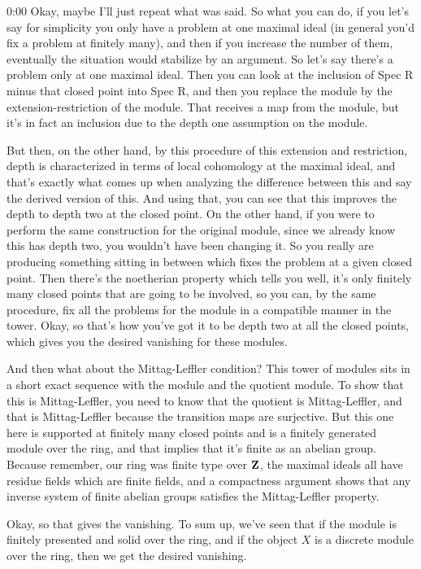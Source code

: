 \begin{unfinished}{0:00}
Okay, maybe I'll just repeat what was said. So what you can do, if you let's say for simplicity you only have a problem at one maximal ideal (in general you'd fix a problem at finitely many), and then if you increase the number of them, eventually the situation would stabilize by an argument. So let's say there's a problem only at one maximal ideal. Then you can look at the inclusion of Spec R minus that closed point into Spec R, and then you replace the module by the extension-restriction of the module. That receives a map from the module, but it's in fact an inclusion due to the depth one assumption on the module.

But then, on the other hand, by this procedure of this extension and restriction, depth is characterized in terms of local cohomology at the maximal ideal, and that's exactly what comes up when analyzing the difference between this and say the derived version of this. And using that, you can see that this improves the depth to depth two at the closed point. On the other hand, if you were to perform the same construction for the original module, since we already know this has depth two, you wouldn't have been changing it. So you really are producing something sitting in between which fixes the problem at a given closed point. Then there's the noetherian property which tells you well, it's only finitely many closed points that are going to be involved, so you can, by the same procedure, fix all the problems for the module in a compatible manner in the tower. Okay, so that's how you've got it to be depth two at all the closed points, which gives you the desired vanishing for these modules.

And then what about the Mittag-Leffler condition? This tower of modules sits in a short exact sequence with the module and the quotient module. To show that this is Mittag-Leffler, you need to know that the quotient is Mittag-Leffler, and that is Mittag-Leffler because the transition maps are surjective. But this one here is supported at finitely many closed points and is a finitely generated module over the ring, and that implies that it's finite as an abelian group. Because remember, our ring was finite type over $\mathbf Z$, the maximal ideals all have residue fields which are finite fields, and a compactness argument shows that any inverse system of finite abelian groups satisfies the Mittag-Leffler property.

Okay, so that gives the vanishing. To sum up, we've seen that if the module is finitely presented and solid over the ring, and if the object $X$ is a discrete module over the ring, then we get the desired vanishing.


\end{unfinished}
